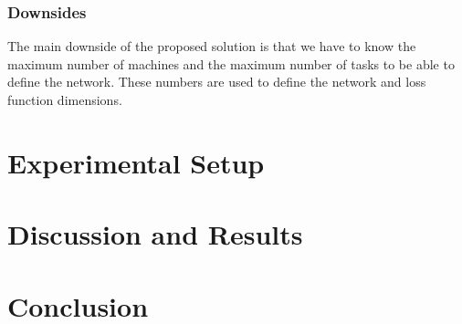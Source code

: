\documentclass[twocolumn,11pt]{IEEEtran}
\begin{document}
\subsubsection{Downsides}
The main downside of the proposed solution is that we have to know the maximum number of machines and the maximum number of tasks to be able to define the network. These numbers are used to define the network and loss function dimensions. 
    
\section{Experimental Setup}

\section{Discussion and Results}

\section{Conclusion}

\medskip



    
\end{document}
